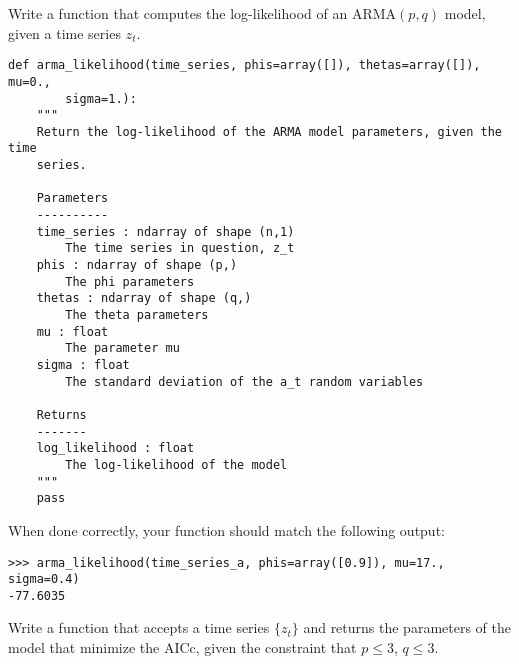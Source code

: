 
\label{prob:arma:likelihood}
Write a function that computes the log-likelihood of an $\text{ARMA}(p,q)$
model, given a time series $z_t$.

\begin{lstlisting}
def arma_likelihood(time_series, phis=array([]), thetas=array([]), mu=0.,
        sigma=1.):
    """
    Return the log-likelihood of the ARMA model parameters, given the time
    series.

    Parameters
    ----------
    time_series : ndarray of shape (n,1)
        The time series in question, z_t
    phis : ndarray of shape (p,)
        The phi parameters
    thetas : ndarray of shape (q,)
        The theta parameters
    mu : float
        The parameter mu
    sigma : float
        The standard deviation of the a_t random variables

    Returns
    -------
    log_likelihood : float
        The log-likelihood of the model
    """
    pass
\end{lstlisting}

\vspace{3mm} \noindent
When done correctly, your function should match the following output:
\begin{lstlisting}
>>> arma_likelihood(time_series_a, phis=array([0.9]), mu=17., sigma=0.4)
-77.6035
\end{lstlisting}

\label{prob:arma:mle}
Write a function that accepts a time series $\{z_t\}$ and returns the
parameters of the model that minimize the AICc, given the constraint that $p
\leq 3$, $q \leq 3$.

